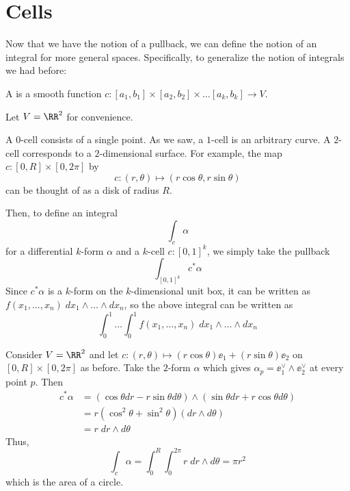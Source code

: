 \documentclass[11pt]{scrreprt}
\begin{document}
\section{Cells}
Now that we have the notion of a pullback,
we can define the notion of an integral for more general spaces.
Specifically, to generalize the notion of integrals we had before:
\begin{definition}
	A  is a smooth function $c : [a_1, b_1] \times [a_2,b_2] \times \dots [a_k, b_k] \to V$.
\end{definition}
\begin{example}
	Let $V = \RR^2$ for convenience.
	\begin{enumerate}[(a)]
		\ii A $0$-cell consists of a single point.
		\ii As we saw, a $1$-cell is an arbitrary curve.
		\ii A $2$-cell corresponds to a $2$-dimensional surface.
		For example, the map $c : [0,R] \times [0,2\pi]$ by
		\[ c : (r,\theta) \mapsto (r\cos\theta, r\sin\theta) \]
		can be thought of as a disk of radius $R$.
	\end{enumerate}
\end{example}
Then, to define an integral
\[ \int_c \alpha \]
for a differential $k$-form $\alpha$ and a $k$-cell $c : [0,1]^k$, we simply take the pullback
\[ \int_{[0,1]^k} c^\ast \alpha \]
Since $c^\ast \alpha$ is a $k$-form on the $k$-dimensional unit box,
it can be written as $f(x_1, \dots, x_n) \; dx_1 \wedge \dots \wedge dx_n$,
so the above integral can be written as
\[ \int_0^1 \dots \int_0^1 f(x_1, \dots, x_n) \; dx_1 \wedge \dots \wedge dx_n \]

\begin{example}
	Consider $V = \RR^2$ and let $c : (r,\theta) \mapsto (r\cos\theta)\ee_1 + (r\sin\theta)\ee_2$
	on $[0,R] \times [0,2\pi]$ as before.
	Take the $2$-form $\alpha$ which gives $\alpha_p = \ee_1^\vee \wedge \ee_2^\vee$ at every point $p$.
	Then
	\begin{align*}
		c^\ast\alpha &= 
		\left( \cos\theta dr - r\sin\theta d\theta \right)
		\wedge
		\left( \sin\theta dr + r\cos\theta d\theta \right) \\
		&= r(\cos^2\theta+\sin^2\theta) (dr \wedge d\theta) \\
		&= r \; dr \wedge d\theta
	\end{align*}
	Thus,
	\[ \int_c \alpha
		= \int_0^R \int_0^{2\pi} r \; dr \wedge d\theta
		= \pi r^2 \]
	which is the area of a circle.
\end{example}
\end{document}
